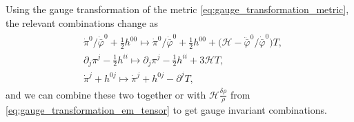Using the gauge transformation of the metric \eqref{eq:gauge_transformation_metric}, the relevant combinations change as
{\small
\begin{align}\label{eq:gauge_transformation_fluid_and_metric_combinations}
\begin{aligned}
    &\dot{\pi}^0/\dot{\bar{\varphi}}^0+\tfrac12 h^{00} \mapsto \dot{\pi}^0/\dot{\bar{\varphi}}^0+\tfrac12 h^{00} +\big(\mathcal{H}-\ddot{\bar{\varphi}}^0/\dot{\bar{\varphi}}^0\big) T, \\
    &\partial_j\pi^j -\tfrac12 h^{ii} \mapsto \partial_j\pi^j -\tfrac12 h^{ii} +3\mathcal{H} T, \\
    &\dot{\pi}^j+h^{0j} \mapsto \dot{\pi}^j+h^{0j} -\partial^j T,
\end{aligned}\end{align}}
and we can combine these two together or with $\mathcal{H}\frac{\delta \rho}{\dot{\rho}}$ from \eqref{eq:gauge_transformation_em_tensor} to get gauge invariant combinations.

